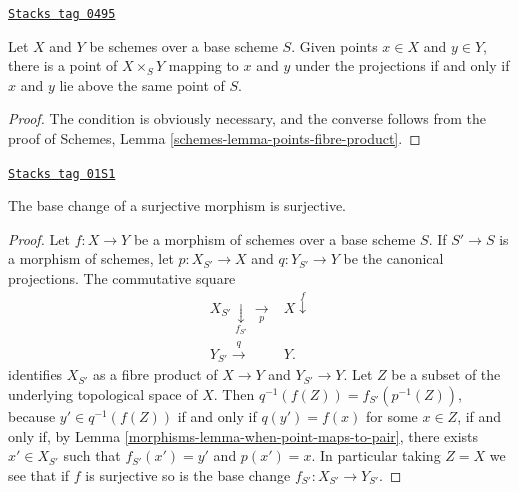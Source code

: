 \begin{lemma}
\label{morphisms-lemma-when-point-maps-to-pair}
\href{https://stacks.math.columbia.edu/tag/0495}{\texttt{Stacks tag 0495}}

Let $X$ and $Y$ be schemes over a base scheme $S$. Given points $x \in X$ and
$y \in Y$, there is a point of $X \times_S Y$ mapping to $x$ and $y$ under the
projections if and only if $x$ and $y$ lie above the same point of $S$.
\end{lemma}

\begin{proof}
The condition is obviously necessary, and the converse follows from the proof
of Schemes, Lemma \ref{schemes-lemma-points-fibre-product}.
\end{proof}

\begin{lemma}
\label{morphisms-lemma-base-change-surjective}
\href{https://stacks.math.columbia.edu/tag/01S1}{\texttt{Stacks tag 01S1}}

The base change of a surjective morphism is surjective.
\end{lemma}

\begin{proof}

Let $f: X \to Y$ be a morphism of schemes over a base scheme $S$.
If $S' \to S$ is a morphism of schemes, let $p: X_{S'} \to X$
and $q: Y_{S'} \to Y$ be the canonical projections.  The commutative
square
$$
\begin{array}{cc}X_{S'} \underset{f_{S'}}{\downarrow}\underset{p}{\longrightarrow} & X \overset{f}{\downarrow} \\ Y_{S'} \overset{q}{\longrightarrow} & Y.\end{array}
$$
identifies $X_{S'}$ as a fibre product of $X \to Y$ and
$Y_{S'} \to Y$.  Let $Z$ be a subset of the underlying topological
space of $X$.  Then $q^{-1}(f(Z)) = f_{S'}(p^{-1}(Z))$, because
$y' \in q^{-1}(f(Z))$ if and only if $q(y') = f(x)$ for some $x \in Z$,
if and only if, by Lemma \ref{morphisms-lemma-when-point-maps-to-pair}, there exists
$x' \in X_{S'}$ such that $f_{S'}(x') = y'$ and $p(x') = x$.  In particular
taking $Z = X$ we see that if $f$ is surjective so is the base change
$f_{S'}: X_{S'} \to Y_{S'}$.
\end{proof}

